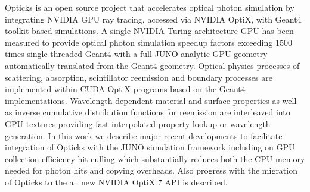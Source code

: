 Opticks is an open source project that accelerates optical photon simulation by 
integrating NVIDIA GPU ray tracing, accessed via NVIDIA OptiX, with 
Geant4 toolkit based simulations. 
A single NVIDIA Turing architecture GPU has been measured to provide optical 
photon simulation speedup factors exceeding 1500 times single threaded Geant4 
with a full JUNO analytic GPU geometry automatically translated from the Geant4 geometry.
%
Optical physics processes of scattering, absorption, scintillator reemission and 
boundary processes are implemented within CUDA OptiX programs based on the Geant4
implementations. Wavelength-dependent material and surface properties as well as  
inverse cumulative distribution functions for reemission are interleaved into 
GPU textures providing fast interpolated property lookup or wavelength generation.
%
In this work we describe major recent developments to facilitate integration of Opticks with the 
JUNO simulation framework including on GPU collection efficiency hit culling which 
substantially reduces both the CPU memory needed for photon hits and copying overheads. 
Also progress with the migration of Opticks to the all new NVIDIA OptiX 7 API is described.

